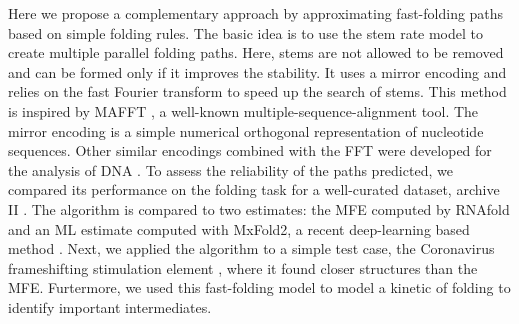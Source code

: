 \documentclass[a4paper,12pt]{article}
\begin{document}
Here we propose a complementary approach by approximating fast-folding paths
based on simple folding rules. The basic idea is to use the stem rate model to
create multiple parallel folding paths. Here, stems are not allowed to be
removed and can be formed only if it improves the stability. It uses a mirror
encoding and relies on the fast Fourier transform to speed up the search of
stems. This method is inspired by MAFFT \cite{katoh02_mafft}, a well-known
multiple-sequence-alignment tool. The mirror encoding is a simple numerical
orthogonal representation of nucleotide sequences. Other similar encodings
combined with the FFT were developed for the analysis of DNA
\cite{felsenstein82_effic_method_match_nucleic_acid_sequen}. To assess the
reliability of the paths predicted, we compared its performance on the folding
task for a well-curated dataset, archive II
\cite{mathews19_how_to_bench_rna_secon}. The algorithm is compared to two
estimates: the MFE computed by RNAfold and an ML estimate computed with MxFold2,
a recent deep-learning based method \cite{sato20_rna}. Next, we applied the
algorithm to a simple test case, the Coronavirus frameshifting stimulation
element \cite{baranov05_progr_ribos_frames_decod_sars_cov_genom}, where it found
closer structures than the MFE. Furtermore, we used this fast-folding model to
model a kinetic of folding to identify important intermediates.
\end{document}
